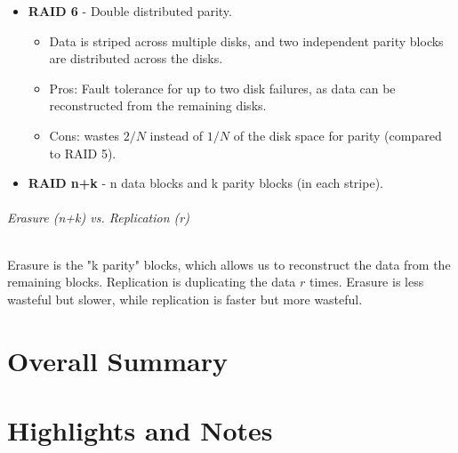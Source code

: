 \documentclass[openany,12pt]{book}
\begin{document}
\begin{itemize}
  \item \textbf{RAID 6} - Double distributed parity.\\
  \begin{itemize}
    \item Data is striped across multiple disks, and two independent parity blocks are distributed across the disks.
    \item Pros: Fault tolerance for up to two disk failures, as data can be reconstructed from the remaining disks. 
    \item Cons: wastes \(2/N\) instead of \(1/N\) of the disk space for parity (compared to RAID 5).
  \end{itemize}

  \item \textbf{RAID n+k} - n data blocks and k parity blocks (in each stripe).
\end{itemize}

\paragraph{Erasure (n+k) vs. Replication (r)} Erasure is the "k parity" blocks, which allows us to reconstruct the data from the remaining blocks. Replication is duplicating the data \(r\) times. Erasure is less wasteful but slower, while replication is faster but more wasteful.







\newpage
\part{Overall Summary}
















\newpage
\part{Highlights and Notes}
\end{document}
